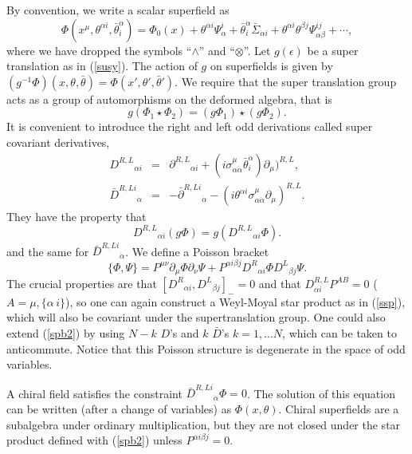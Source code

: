 \documentclass[a4paper,12pt]{article}
\begin{document}
By convention, we write a  scalar superfield as
$$
\Phi(x^\mu,\theta^{\alpha i},\bar\theta^{\dot\alpha }_i)=\Phi_0(x)+
 \theta^{\alpha i}\Psi_{\alpha}^i + \bar\theta^{\dot\alpha }_i
\bar\Sigma_{\dot \alpha i}+\theta^{\alpha i}\theta^{\beta j}
\Psi_{\alpha\beta}^{ij} +\cdots,
$$
where we have dropped the symbols ``$\wedge$'' and ``$\otimes$''.
Let $g(\epsilon)$ be a super translation  as in (\ref{susy}). The action 
of $g$ on superfields is given by 
$(g^{-1}\Phi)(x,\theta,\bar\theta)=\Phi(x',\theta',\bar\theta')$. 
We require that the super translation  group acts as a group of
 automorphisms on the deformed algebra, that is
$$
g(\Phi_1\star \Phi_2)=(g\Phi_1)\star (g\Phi_2).
$$
It is convenient to introduce the right and left odd derivations called
super covariant derivatives, 
\begin{eqnarray*}
{D^{R,L}}_{\alpha i}&=&{\partial^{R,L}}_{\alpha i} +
(i\sigma^\mu_{\alpha\dot\alpha}\bar \theta^{\dot\alpha
}_i)\partial_\mu)^{R,L},
\\
{ {\bar D}^{R,Li} }_{\dot\alpha}&=&-{ {\bar \partial}^{R,Li}
}_{\dot\alpha}-
(i\theta^{\alpha i}\sigma^\mu_{\alpha\dot\alpha}\partial_\mu)^{R,L}.
\end{eqnarray*}
They have the property that
$$
{D^{R,L}}_{\alpha i}(g\Phi)=g({D^{R,L}}_{\alpha i}\Phi).
$$
and the same for ${ {\bar D}^{R,Li} }_{\dot\alpha}$. We define a Poisson
bracket 
\begin{equation}
\{\Phi,\Psi\}=P^{\mu\nu}\partial_\mu\Phi\partial_\nu\Psi +P^{\alpha i\beta
j}
{D^{R}}_{\alpha i}\Phi{D^{L}}_{\beta j}\Psi.
\label{spb2}
\end{equation}
The crucial properties are that $[{D^{R}}_{\alpha i},{D^{L}}_{\beta
j}]_-=0$ and that
$D^{R,L}_{\alpha i}P^{AB}=0$ ($A=\mu,\{\alpha\,i\}$),  so one 
can again construct a Weyl-Moyal star product as in  (\ref{ssp}), which
will 
also be covariant under the supertranslation group.  One could also extend
(\ref{spb2}) 
by using  $N-k$ $D$'s and $k$ $\bar D$'s $k=1,\dots N$, which can be taken
to  anticommute. 
 Notice that this Poisson structure
is   degenerate in the  space of odd variables.

A chiral field \cite{fwz} satisfies the constraint ${ {\bar
D}^{R,Li}}_{\dot\alpha}\Phi=0$. 
The solution of this equation can be written (after a change of variables)
as 
$\Phi(x,\theta)$. Chiral superfields are a subalgebra under  ordinary
multiplication,
but they are not  closed under the star product
defined with (\ref{spb2}) unless $P^{\alpha i\beta j}=0$. 

\bigskip
\end{document}
